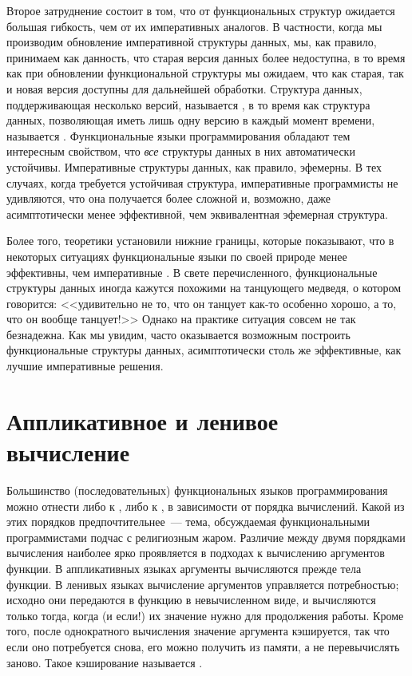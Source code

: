 Второе затруднение состоит в том, что от функциональных структур
ожидается большая гибкость, чем от их императивных аналогов.  В
частности, когда мы производим обновление императивной структуры
данных, мы, как правило, принимаем как данность, что старая версия
данных более недоступна, в то время как при обновлении функциональной
структуры мы ожидаем, что как старая, так и новая версия доступны для
дальнейшей обработки. Структура данных, поддерживающая несколько
версий, называется , в то время как
структура данных, позволяющая иметь лишь одну версию в каждый момент
времени, называется 
\cite{DSST1989}. Функциональные языки программирования обладают тем
интересным свойством, что \emph{все} структуры данных в них
автоматически устойчивы. Императивные структуры данных, как правило,
эфемерны. В тех случаях, когда требуется устойчивая структура,
императивные программисты не удивляются, что она получается более
сложной и, возможно, даже асимптотически менее эффективной, чем
эквивалентная эфемерная структура.

Более того, теоретики установили нижние границы, которые показывают,
что в некоторых ситуациях функциональные языки по своей природе менее
эффективны, чем императивные \cite{BAG1992, Pippenger1996}.  В свете
перечисленного, функциональные структуры данных иногда кажутся
похожими на танцующего медведя, о котором говорится: <<удивительно не
то, что он танцует как-то особенно хорошо, а то, что он вообще
танцует!>> Однако на практике ситуация совсем не так безнадежна. Как
мы увидим, часто оказывается возможным построить функциональные
структуры данных, асимптотически столь же эффективные, как лучшие
императивные решения.

\section{Аппликативное и ленивое вычисление}

Большинство (последовательных) функциональных языков программирования
можно отнести либо к , либо к
, в зависимости от порядка вычислений.  Какой из
этих порядков предпочтительнее~--- тема, обсуждаемая функциональными
программистами подчас с религиозным жаром.  Различие между двумя
порядками вычисления наиболее ярко проявляется в подходах к вычислению
аргументов функции. В аппликативных языках аргументы вычисляются
прежде тела функции. В ленивых языках вычисление аргументов управляется
потребностью; исходно они передаются в функцию в невычисленном виде, и
вычисляются только тогда, когда (и если!) их значение нужно
для продолжения работы.  Кроме того, после однократного вычисления
значение аргумента кэшируется, так что если оно потребуется снова, его
можно получить из памяти, а не перевычислять заново.  Такое
кэширование называется 
\cite{Michie1968}.

